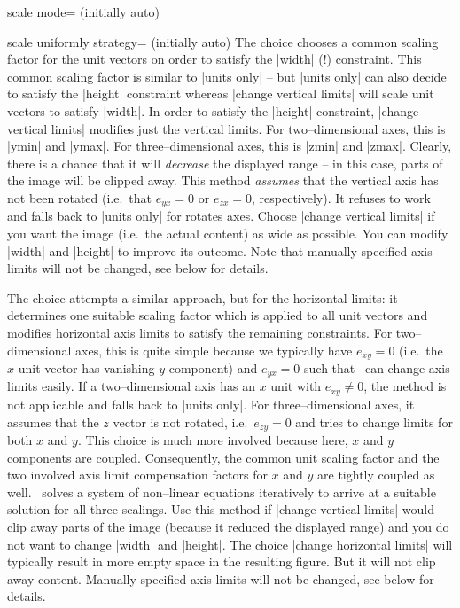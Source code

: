 \begin{pgfplotskey}{scale mode= (initially auto)}
\begin{pgfplotskey}{scale uniformly strategy= (initially auto)}
		The choice  chooses a common scaling factor for the unit vectors on order to satisfy the |width| (!) constraint. This common scaling factor is similar to |units only| -- but |units only| can also decide to satisfy the |height| constraint whereas  |change vertical limits| will scale unit vectors to satisfy |width|. In order to satisfy the |height| constraint, |change vertical limits| modifies just the vertical limits. For two--dimensional axes, this is |ymin| and |ymax|. For three--dimensional axes, this is |zmin| and |zmax|. Clearly, there is a chance that it will \emph{decrease} the displayed range -- in this case, parts of the image will be clipped away. This method \emph{assumes} that the vertical axis has not been rotated (i.e.\ that $e_{yx}=0$ or $e_{zx}=0$, respectively). It refuses to work and falls back to |units only| for rotates axes. Choose |change vertical limits| if you want the image (i.e.\ the actual content) as wide as possible. You can modify |width| and |height| to improve its outcome. Note that manually specified axis limits will not be changed, see below for details.

		The choice  attempts a similar approach, but for the horizontal limits: it determines one suitable scaling factor which is applied to all unit vectors and modifies horizontal axis limits to satisfy the remaining constraints. For two--dimensional axes, this is quite simple because we typically have $e_{xy} = 0$ (i.e.\ the $x$ unit vector has vanishing $y$ component) and $e_{yx}=0$ such that \PGFPlots\ can change axis limits easily. If a two--dimensional axis has an $x$ unit with $e_{xy} \neq 0$, the method is not applicable and falls back to |units only|. For three--dimensional axes, it assumes that the $z$ vector is not rotated, i.e.\ $e_{zy} = 0$ and tries to change limits for both $x$ and $y$. This choice is much more involved because here, $x$ and $y$ components are coupled. Consequently, the common unit scaling factor and the two involved axis limit compensation factors for $x$ and $y$ are tightly coupled as well. \PGFPlots\ solves a system of non--linear equations iteratively to arrive at a suitable solution for all three scalings. Use this method if |change vertical limits| would clip away parts of the image (because it reduced the displayed range) and you do not want to change |width| and |height|. The choice |change horizontal limits| will typically result in more empty space in the resulting figure. But it will not clip away content. Manually specified axis limits will not be changed, see below for details.


\end{pgfplotskey}
\end{pgfplotskey}
